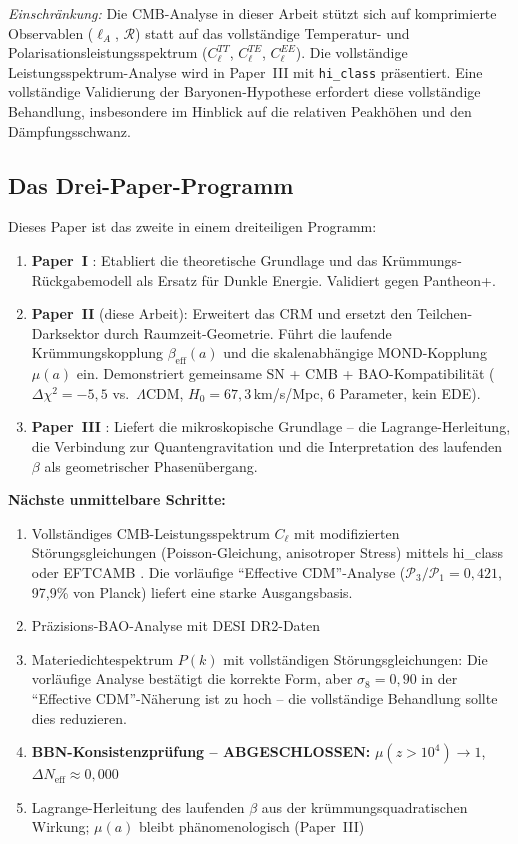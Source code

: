\documentclass[aps,prd,twocolumn,superscriptaddress,nofootinbib]{revtex4-2}
\begin{document}
\textit{Einschr\"ankung:} Die CMB-Analyse in dieser Arbeit st\"utzt sich auf komprimierte Observablen ($\ell_A$, $\mathcal{R}$) statt auf das vollst\"andige Temperatur- und Polarisationsleistungsspektrum ($C_\ell^{TT}$, $C_\ell^{TE}$, $C_\ell^{EE}$). Die vollst\"andige Leistungsspektrum-Analyse wird in Paper~III \cite{Geiger2026c} mit \texttt{hi\_class} pr\"asentiert. Eine vollst\"andige Validierung der Baryonen-Hypothese erfordert diese vollst\"andige Behandlung, insbesondere im Hinblick auf die relativen Peakh\"ohen und den D\"ampfungsschwanz.

\subsection{Das Drei-Paper-Programm}

Dieses Paper ist das zweite in einem dreiteiligen Programm:
\begin{enumerate}
\item \textbf{Paper~I} \cite{Geiger2026}: Etabliert die theoretische Grundlage und das Kr\"ummungs-R\"uckgabemodell als Ersatz f\"ur Dunkle Energie. Validiert gegen Pantheon+.
\item \textbf{Paper~II} (diese Arbeit): Erweitert das CRM und ersetzt den Teilchen-Darksektor durch Raumzeit-Geometrie. F\"uhrt die laufende Kr\"ummungskopplung $\beta_{\mathrm{eff}}(a)$ und die skalenabh\"angige MOND-Kopplung $\mu(a)$ ein. Demonstriert gemeinsame SN + CMB + BAO-Kompatibilit\"at ($\Delta\chi^2 = -5{,}5$ vs.\ $\Lambda$CDM, $H_0 = 67{,}3$\,km/s/Mpc, 6 Parameter, kein EDE).
\item \textbf{Paper~III} \cite{Geiger2026c}: Liefert die mikroskopische Grundlage -- die Lagrange-Herleitung, die Verbindung zur Quantengravitation und die Interpretation des laufenden $\beta$ als geometrischer Phasen\"ubergang.
\end{enumerate}

\textbf{N\"achste unmittelbare Schritte:}
\begin{enumerate}
\item Vollst\"andiges CMB-Leistungsspektrum $C_\ell$ mit modifizierten St\"orungsgleichungen (Poisson-Gleichung, anisotroper Stress) mittels hi\_class \cite{Zumalacarregui2017} oder EFTCAMB \cite{Hu2014}. Die vorl\"aufige "`Effective CDM"'-Analyse ($\mathcal{P}_3/\mathcal{P}_1 = 0{,}421$, 97{,}9\% von Planck) liefert eine starke Ausgangsbasis.
\item Pr\"azisions-BAO-Analyse mit DESI DR2-Daten
\item Materiedichtespektrum $P(k)$ mit vollst\"andigen St\"orungsgleichungen: Die vorl\"aufige Analyse best\"atigt die korrekte Form, aber $\sigma_8 = 0{,}90$ in der "`Effective CDM"'-N\"aherung ist zu hoch -- die vollst\"andige Behandlung sollte dies reduzieren.
\item \textbf{BBN-Konsistenzpr\"ufung -- ABGESCHLOSSEN:} $\mu(z > 10^4) \to 1$, $\Delta N_{\mathrm{eff}} \approx 0{,}000$ \cite{Pitrou2018}
\item Lagrange-Herleitung des laufenden $\beta$ aus der kr\"ummungsquadratischen Wirkung; $\mu(a)$ bleibt ph\"anomenologisch (Paper~III)
\end{enumerate}
\end{document}
